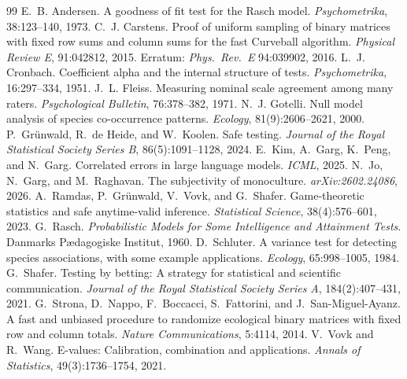 \documentclass{article}
\begin{document}
\begin{thebibliography}{99}
\small
{} E.~B. Andersen. A goodness of fit test for the Rasch model. \emph{Psychometrika}, 38:123--140, 1973.
 C.~J. Carstens. Proof of uniform sampling of binary matrices with fixed row sums and column sums for the fast Curveball algorithm. \emph{Physical Review E}, 91:042812, 2015. Erratum: \emph{Phys.\ Rev.\ E} 94:039902, 2016.
 L.~J. Cronbach. Coefficient alpha and the internal structure of tests. \emph{Psychometrika}, 16:297--334, 1951.
 J.~L. Fleiss. Measuring nominal scale agreement among many raters. \emph{Psychological Bulletin}, 76:378--382, 1971.
 N.~J. Gotelli. Null model analysis of species co-occurrence patterns. \emph{Ecology}, 81(9):2606--2621, 2000.
 P.~Gr{\"u}nwald, R.~de Heide, and W.~Koolen. Safe testing. \emph{Journal of the Royal Statistical Society Series B}, 86(5):1091--1128, 2024.
 E.~Kim, A.~Garg, K.~Peng, and N.~Garg. Correlated errors in large language models. \emph{ICML}, 2025.
 N.~Jo, N.~Garg, and M.~Raghavan. The subjectivity of monoculture. \emph{arXiv:2602.24086}, 2026.
 A.~Ramdas, P.~Gr{\"u}nwald, V.~Vovk, and G.~Shafer. Game-theoretic statistics and safe anytime-valid inference. \emph{Statistical Science}, 38(4):576--601, 2023.
 G.~Rasch. \emph{Probabilistic Models for Some Intelligence and Attainment Tests}. Danmarks P\ae dagogiske Institut, 1960.
 D.~Schluter. A variance test for detecting species associations, with some example applications. \emph{Ecology}, 65:998--1005, 1984.
 G.~Shafer. Testing by betting: A strategy for statistical and scientific communication. \emph{Journal of the Royal Statistical Society Series A}, 184(2):407--431, 2021.
 G.~Strona, D.~Nappo, F.~Boccacci, S.~Fattorini, and J.~San-Miguel-Ayanz. A fast and unbiased procedure to randomize ecological binary matrices with fixed row and column totals. \emph{Nature Communications}, 5:4114, 2014.
 V.~Vovk and R.~Wang. E-values: Calibration, combination and applications. \emph{Annals of Statistics}, 49(3):1736--1754, 2021.
\end{thebibliography}
\end{document}
